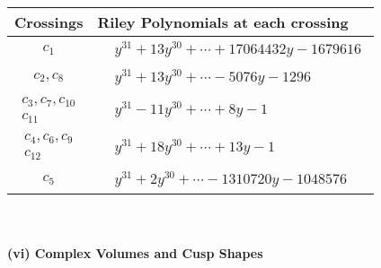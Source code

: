 \documentclass[1p]{elsarticle_modified}
\theoremstyle{definition}
\begin{document}
\begin{tabular}{m{50pt}|m{274pt}}
Crossings & \hspace{64pt}Riley Polynomials at each crossing \\
\hline $$\begin{aligned}c_{1}\end{aligned}$$&$\begin{aligned}
&y^{31}+13 y^{30}+\cdots+17064432 y-1679616
\end{aligned}$\\
\hline $$\begin{aligned}c_{2},c_{8}\end{aligned}$$&$\begin{aligned}
&y^{31}+13 y^{30}+\cdots-5076 y-1296
\end{aligned}$\\
\hline $$\begin{aligned}c_{3},c_{7},c_{10}\\c_{11}\end{aligned}$$&$\begin{aligned}
&y^{31}-11 y^{30}+\cdots+8 y-1
\end{aligned}$\\
\hline $$\begin{aligned}c_{4},c_{6},c_{9}\\c_{12}\end{aligned}$$&$\begin{aligned}
&y^{31}+18 y^{30}+\cdots+13 y-1
\end{aligned}$\\
\hline $$\begin{aligned}c_{5}\end{aligned}$$&$\begin{aligned}
&y^{31}+2 y^{30}+\cdots-1310720 y-1048576
\end{aligned}$\\
\hline
\end{tabular}\\~\\
\newpage\flushleft \textbf{(vi) Complex Volumes and Cusp Shapes}
\end{document}
